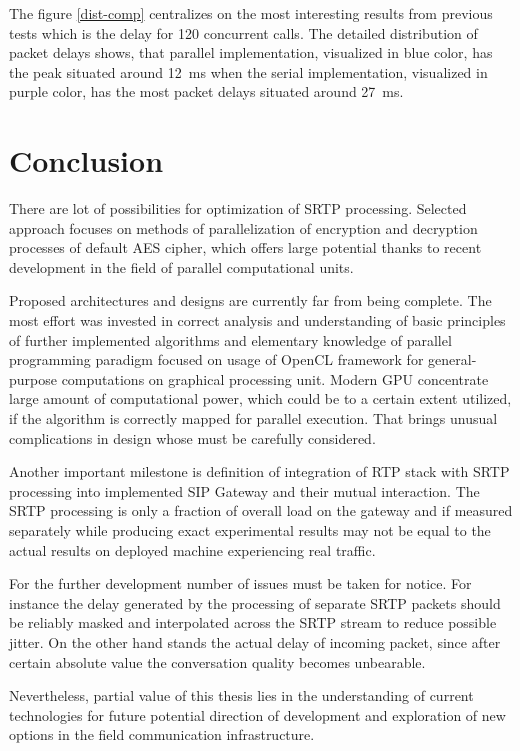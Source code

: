 The figure \ref{dist-comp} centralizes on the most interesting results from
previous tests which is the delay for 120 concurrent calls. The detailed 
distribution of packet delays shows, that parallel implementation, visualized
in blue color, has the peak situated around 12~ms when the serial 
implementation, visualized in purple color, has the most packet delays situated
around 27~ms.     



\chapter{Conclusion}\label{chapter:conclusion}
There are lot of possibilities for optimization of SRTP processing. Selected
approach focuses on methods of parallelization of encryption and decryption
processes of default AES cipher, which offers large potential thanks to recent
development in the field of parallel computational units.

Proposed architectures and designs are currently far from being complete. The 
most effort was invested in correct analysis and understanding of basic 
principles of further implemented algorithms and elementary knowledge of 
parallel programming paradigm focused on usage of OpenCL framework for
general-purpose computations on graphical processing unit. Modern GPU 
concentrate large amount of computational power, which could be to a certain
extent utilized, if the algorithm is correctly mapped for parallel execution.
That brings unusual complications in design whose must be carefully considered.

Another important milestone is definition of integration of RTP stack with SRTP 
processing into implemented SIP Gateway and their mutual interaction. The SRTP 
processing is only a fraction of overall load on the gateway and if measured 
separately while producing exact experimental results may not be equal to the 
actual results on deployed machine experiencing real traffic. 

For the further development number of issues must be taken for notice. For 
instance the delay generated by the processing of separate SRTP packets should 
be reliably masked and interpolated across the SRTP stream to reduce possible 
jitter. On the other hand stands the actual delay of incoming packet, since
after certain absolute value the conversation quality becomes unbearable.

Nevertheless, partial value of this thesis lies in the understanding of current
technologies for future potential direction of development and exploration of
new options in the field communication infrastructure.



